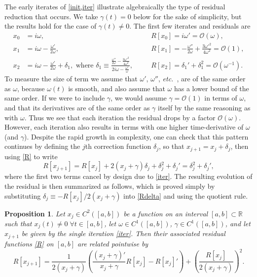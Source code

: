 \documentclass[10pt]{article}
\newcommand{\be}{\begin{equation}}
\newcommand{\ee}{\end{equation}}
\newcommand{\etc}{{\it etc.\ }}
\newcommand{\R}{\mathbb{R}}
\newcommand{\bigO}{{\mathcal O}}
\newtheorem{pro}[thm]{Proposition}
\newcommand{\om}{\omega}
\newcommand{\g}{\gamma}
\begin{document}
The early iterates of \cref{init,iter} illustrate
algebraically
the type of residual reduction that occurs. We take $\g(t) = 0$ below for the
sake of simplicity, but the results hold for the case of $\g(t) \neq 0$. The first few iterates and residuals are
\begin{align}
    x_0 &=  i\om, &&R[x_0] = i\om' = \bigO(\om), \nonumber \\
x_1 &= i\om - \frac{\om'}{2\om}, 
    &&R[x_1] = -\frac{\om''}{2\om} + \frac{3\om'^2}{4\om^2} = \bigO(1), \nonumber \\
x_2 &= i\om - \frac{\om'}{2\om} + \delta_1, \mbox{ where }
    \delta_1 \equiv \frac{\frac{\om''}{2\om} - \frac{3\om'^2}{4\om^2}}{2i\om - \frac{\om'}{\om}}, \quad
    &&R[x_2] = \delta_1' + \delta_1^2 = \bigO(\om^{-1}). \nonumber
\end{align}
To measure the size of term we assume that $\om'$, $\om''$, \etc, are
of the same order as $\om$, because $\om(t)$ is smooth,
and also assume that $\om$ has a lower bound of the same order. If we were to include $\g$, we would assume $\g = \bigO(1) $ in terms of $\om$, and that its derivatives are of the same order as $\g$ itself by the same reasoning as with $\om$. 
Thus we see that each iteration the residual drops by a factor $\bigO(\om)$.
However, each iteration also results in terms with
one higher time-derivative of $\om$ (and $\g$).
Despite the rapid growth in complexity, one can check that this
pattern continues
by defining the $j$th correction function $\delta_j$,
so that $x_{j+1} = x_j + \delta_j$, then using \cref{R} to write
\be
R[x_{j+1}] = R[x_j] + 2\left(x_j + \g \right)\delta_j  + \delta_j^2 + \delta_j' = \delta_j^2 + \delta_j',
\label{Rdelta}
\ee
where the first two terms cancel by design due to \cref{iter}.
The resulting evolution of the residual is then
summarized as follows, which is proved simply by
substituting $\delta_j \equiv -R[x_j]/2(x_j + \g)$ into \cref{Rdelta} and using
the quotient rule.
\begin{pro}\label{PRiter}
  Let $x_j \in C^2([a,b])$ be a function on an interval $[a,b]\subset \R$
  such that $x_j(t) \neq 0 \; \forall t\in [a,b]$,
  let $\om\in C^1([a,b])$,
  $\g\in C^1([a,b])$,
  and let $x_{j+1}$ be given by the single iteration \cref{iter}.
  Then their associated residual functions \cref{R} on $[a,b]$
  are related pointwise by
  \be
  \label{Riter}
    R[x_{j+1}] = \frac{1}{2(x_j + \g)}\left( \frac{(x_j + \g)'}{x_j + \g} R[x_j] - R[x_j]' \right) 
    + \left(\frac{R[x_j]}{2(x_j + \g)}\right)^2. 
  \ee
\end{pro}
\end{document}
